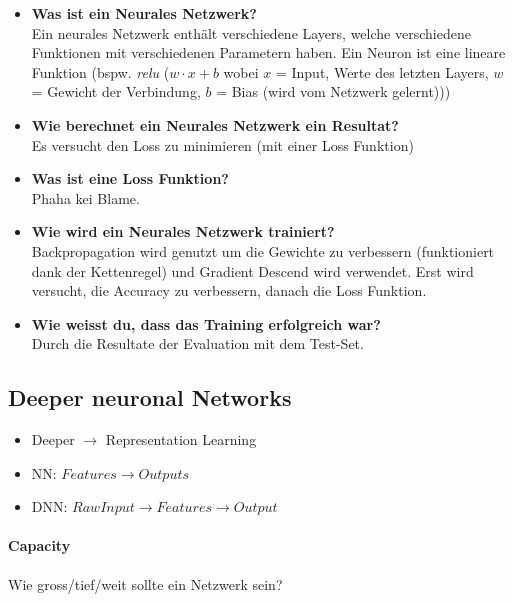 \documentclass[a4paper]{article}
\begin{document}
		\begin{itemize}
			\item \textbf{Was ist ein Neurales Netzwerk?} \\
				Ein neurales Netzwerk enthält verschiedene Layers, welche verschiedene Funktionen mit verschiedenen Parametern haben.
				Ein Neuron ist eine lineare Funktion (bspw. \textit{relu} ($w \cdot x + b$ wobei $x$ = Input, Werte des letzten Layers, $w$ = Gewicht der Verbindung, $b$ = Bias (wird vom Netzwerk gelernt)))
			\item \textbf{Wie berechnet ein Neurales Netzwerk ein Resultat?} \\
				Es versucht den Loss zu minimieren (mit einer Loss Funktion)
			\item \textbf{Was ist eine Loss Funktion?} \\
				Phaha kei Blame.
			\item \textbf{Wie wird ein Neurales Netzwerk trainiert?} \\
				Backpropagation wird genutzt um die Gewichte zu verbessern (funktioniert dank der Kettenregel) und Gradient Descend wird verwendet. Erst wird versucht, die Accuracy zu verbessern, danach die Loss Funktion.
			\item \textbf{Wie weisst du, dass das Training erfolgreich war?} \\
				Durch die Resultate der Evaluation mit dem Test-Set.
		\end{itemize}
	
		\subsection{Deeper neuronal Networks}
		
		\begin{itemize}
			\item Deeper $\rightarrow$ Representation Learning
			\item NN: $Features \rightarrow Outputs$
			\item DNN: $Raw Input \rightarrow Features \rightarrow Output$
		\end{itemize}
		
		\paragraph{Capacity}
		
		Wie gross/tief/weit sollte ein Netzwerk sein?
		
\end{document}
